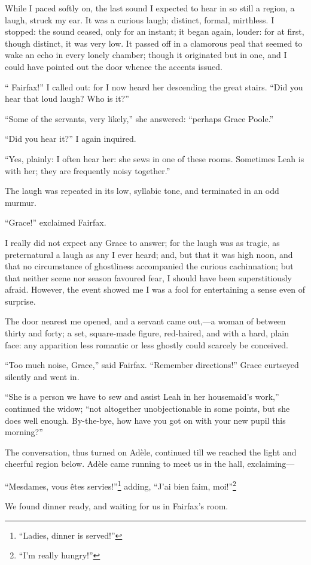 While I paced softly on, the last sound I expected to hear in so still a
region, a laugh, struck my ear. It was a curious laugh; distinct,
formal, mirthless. I stopped: the sound ceased, only for an instant; it
began again, louder: for at first, though distinct, it was very low. It
passed off in a clamorous peal that seemed to wake an echo in every
lonely chamber; though it originated but in one, and I could have
pointed out the door whence the accents issued.

\enquote{\Mrs{} Fairfax!} I called out: for I now heard her descending the
great stairs. \enquote{Did you hear that loud laugh? Who is it?}

\enquote{Some of the servants, very likely,} she answered:
\enquote{perhaps Grace Poole.}

\enquote{Did you hear it?} I again inquired.

\enquote{Yes, plainly: I often hear her: she sews in one of these
rooms. Sometimes Leah is with her; they are frequently noisy together.}

The laugh was repeated in its low, syllabic tone, and terminated in an
odd murmur.

\enquote{Grace!} exclaimed \Mrs{} Fairfax.

I really did not expect any Grace to answer; for the laugh was as
tragic, as preternatural a laugh as any I ever heard; and, but that it
was high noon, and that no circumstance of ghostliness accompanied the
curious cachinnation; but that neither scene nor season favoured fear, I
should have been superstitiously afraid. However, the event showed me I
was a fool for entertaining a sense even of surprise.

The door nearest me opened, and a servant came out,---a woman of between
thirty and forty; a set, square-made figure, red-haired, and with a
hard, plain face: any apparition less romantic or less ghostly could
scarcely be conceived.

\enquote{Too much noise, Grace,} said \Mrs{} Fairfax. \enquote{Remember
directions!} Grace curtseyed silently and went in.

\enquote{She is a person we have to sew and assist Leah in her
housemaid's work,} continued the widow; \enquote{not altogether
unobjectionable in some points, but she does well enough. By-the-bye,
how have you got on with your new pupil this morning?}

The conversation, thus turned on Adèle, continued till we reached the
light and cheerful region below. Adèle came running to meet us in the
hall, exclaiming---

\foreignquote{french}{Mesdames, vous êtes servies!}\footnote{\enquote{Ladies, dinner is served!}} adding, \foreignquote{french}{J'ai bien faim, moi!}\footnote{\enquote{I'm really hungry!}}

We found dinner ready, and waiting for us in \Mrs{} Fairfax's room.
